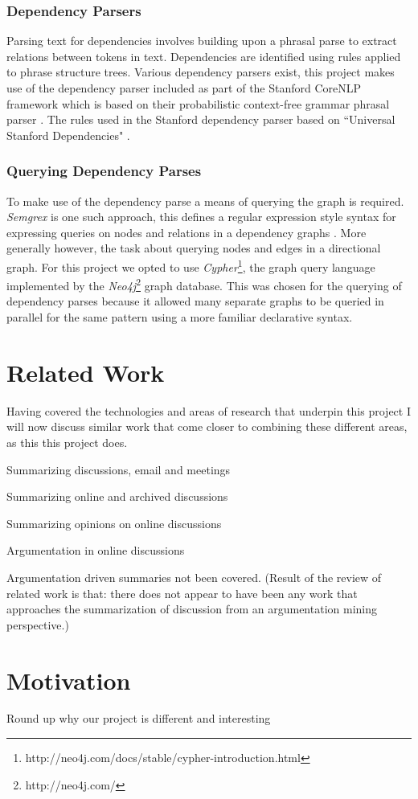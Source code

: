       \subsubsection{Dependency Parsers}
        Parsing text for dependencies involves building upon a phrasal parse to extract relations between tokens in text. Dependencies are identified using rules applied to phrase structure trees. Various dependency parsers exist, this project makes use of the dependency parser included as part of the Stanford CoreNLP framework \cite{de2006generating} which is based on their probabilistic context-free grammar phrasal parser \cite{klein2003accurate}. The rules used in the Stanford dependency parser based on ``Universal Stanford Dependencies" \cite{de2014universal}.
      \subsubsection{Querying Dependency Parses}
        To make use of the dependency parse a means of querying the graph is required. \textit{Semgrex} is one such approach, this defines a regular expression style syntax for expressing queries on nodes and relations in a dependency graphs \cite{Chambers2007}. More generally however, the task about querying nodes and edges in a directional graph. For this project we opted to use \textit{Cypher}\footnote{http://neo4j.com/docs/stable/cypher-introduction.html}, the graph query language implemented by the \textit{Neo4j}\footnote{http://neo4j.com/} graph database. This was chosen for the querying of dependency parses because it allowed many separate graphs to be queried in parallel for the same pattern using a more familiar declarative syntax.

  \section{Related Work}
    Having covered the technologies and areas of research that underpin this project I will now discuss similar work that come closer to combining these different areas, as this this project does.

    Summarizing discussions, email and meetings

    Summarizing online and archived discussions

    Summarizing opinions on online discussions

    Argumentation in online discussions

    Argumentation driven summaries not been covered. (Result of the review of related work is that:  there does not appear to have been any work that approaches the summarization of discussion from an argumentation mining perspective.)

  \section{Motivation}
    Round up why our project is different and interesting
